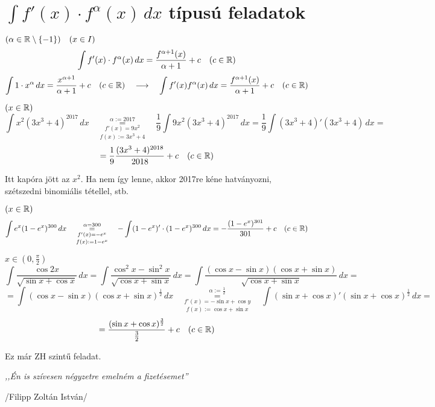 \documentclass[a4paper,11.5pt]{article}
\begin{document}
	\section{$\int f'(x)\cdot f^\alpha(x)\,dx$ típusú feladatok}
	\begin{task} $(\alpha\in\mathbb{R}\setminus\{-1\})\quad (x\in I)$
		\[ \int f'(x)\cdot f^\alpha(x)\,dx=\frac{f^{\alpha+1}(x)}{\alpha+1}+c\quad (c\in\mathbb{R}) \]
		\[ \int 1\cdot x^\alpha\,dx=\frac{x^{\alpha+1}}{\alpha+1}+c\quad (c\in\mathbb{R})\quad \longrightarrow\quad \int f'(x)f^\alpha(x)\,dx=\frac{f^{\alpha+1}(x)}{\alpha+1}+c \quad (c\in\mathbb{R}) \]
	\end{task}
	\begin{task}
		$(x\in\mathbb{R})$
		\[ \int x^2(3x^3+4)^{2017}\,dx\quad \overset{\alpha:=2017}{\underset{f(x):=3x^3+4}{\underset{f'(x)=9x^2}{=}}}\quad \frac{1}{9}\int 9x^2(3x^3+4)^{2017}\,dx=\frac{1}{9}\int(3x^3+4)'(3x^3+4)\,dx=\]
		\[=\frac{1}{9}\frac{(3x^3+4)^{2018}}{2018}+c\quad (c\in\mathbb{R}) \]
		\begin{note}
			Itt kapóra jött az  $x^2$. Ha nem így lenne, akkor 2017re kéne hatványozni, szétszedni binomiális tétellel, stb.
		\end{note}
	\end{task}
	\begin{task}$(x\in\mathbb{R})$
		\[\int e^x (1-e^x)^{300}\,dx\quad \overset{\alpha=300}{\underset{f(x):=1-e^x}{\underset{f'(x)=-e^x}{=}}}\quad -\int(1-e^x)'\cdot(1-e^x)^{300}\,dx=-\frac{(1-e^x)^{301}}{301}+c\quad (c\in\mathbb{R}) \]
	\end{task}
	\begin{task}
		$x\in\left(0,\frac{\pi}{2}\right)$
		\[ \int\frac{\cos2x}{\sqrt{\sin x+\cos x}}\,dx = \int \frac{\cos^2 x-\sin^2 x}{\sqrt{\cos x+\sin x}}\,dx=\int\frac{(\cos x-\sin x)(\cos x+\sin x)}{\sqrt{\cos x+\sin x}}\,dx=\]
		\[=\int(\cos x-\sin x)(\cos x+\sin x)^{\frac{1}{2}}\,dx\quad \overset{\alpha:=\frac{1}{2}}{\underset{f(x):=\cos x+\sin x}{\underset{f'(x)=-\sin x+\cos y}{=}}}\quad \int(\sin x+\cos x)'(\sin x+\cos x)^{\frac{1}{2}}\,dx=\]
		\[=\frac{(\sin x + \cos x)^{\frac{3}{2}}}{\frac{3}{2}}+c\quad (c\in\mathbb{R}) \]
		\begin{note}
			Ez már ZH szintű feladat.
		\end{note}
		\begin{center}
			\textit{,,Én is szívesen négyzetre emelném a fizetésemet''}
			\smallskip
			
			/Filipp Zoltán István/
		\end{center}
	\end{task}
\end{document}
